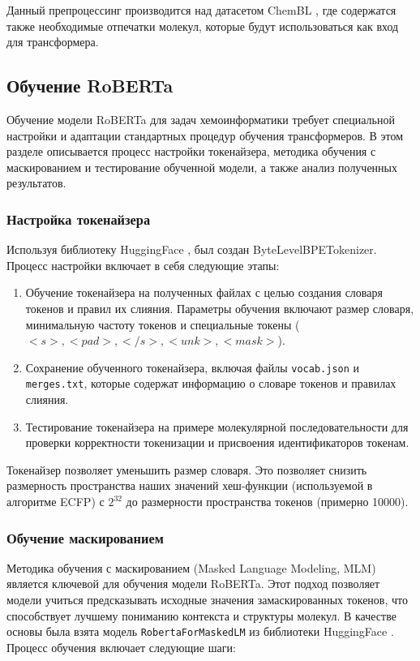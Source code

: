 Данный препроцессинг производится над датасетом ChemBL \cite{ChemBL}, где содержатся также необходимые отпечатки молекул, которые будут использоваться как вход для трансформера.


\subsection{Обучение RoBERTa}
Обучение модели RoBERTa для задач хемоинформатики требует специальной настройки и адаптации стандартных процедур обучения трансформеров. В этом разделе описывается процесс настройки токенайзера, методика обучения с маскированием и тестирование обученной модели, а также анализ полученных результатов.

\subsubsection{Настройка токенайзера}
Используя библиотеку HuggingFace \cite{huggingface}, был создан ByteLevelBPETokenizer. Процесс настройки включает в себя следующие этапы:

\begin{enumerate}
    \item Обучение токенайзера на полученных файлах с целью создания словаря токенов и правил их слияния. Параметры обучения включают размер словаря, минимальную частоту токенов и специальные токены ($<s>, <pad>, </s>, <unk>, <mask>$).
    
    \item Сохранение обученного токенайзера, включая файлы \texttt{vocab.json} и \texttt{merges.txt}, которые содержат информацию о словаре токенов и правилах слияния.
    
    \item Тестирование токенайзера на примере молекулярной последовательности для проверки корректности токенизации и присвоения идентификаторов токенам.
\end{enumerate}
Токенайзер позволяет уменьшить размер словаря. Это позволяет снизить размерность пространства наших значений хеш-функции (используемой в алгоритме ECFP) с $2^{32}$ до размерности пространства токенов (примерно 10000).

\subsubsection{Обучение маскированием}
Методика обучения с маскированием (Masked Language Modeling, MLM) является ключевой для обучения модели RoBERTa. Этот подход позволяет модели учиться предсказывать исходные значения замаскированных токенов, что способствует лучшему пониманию контекста и структуры молекул. В качестве основы была взята модель \texttt{RobertaForMaskedLM} из библиотеки HuggingFace \cite{huggingface}. Процесс обучения включает следующие шаги:

